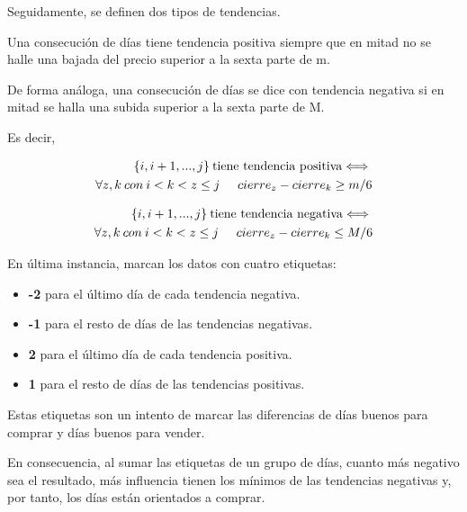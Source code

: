     Seguidamente, se definen dos tipos de tendencias.
    
    Una consecuci\'on de d\'ias tiene tendencia positiva siempre que en mitad no se halle una bajada del precio superior a la sexta parte de m.
    
    De forma an\'aloga, una consecuci\'on de d\'ias se dice con tendencia negativa si en mitad se halla una subida superior a la sexta parte de M.
    
    Es decir,
    
    \begin{align*}
    \begin{split}
        \{i,i+1,...,j\}\: \text{tiene tendencia positiva} \Longleftrightarrow{}\\
        \forall z,k\: con \:i < k < z\leq j\hspace{0.5cm} cierre_{z} - cierre_{k} \geq m/6
    \end{split}
    \end{align*}
    
    \begin{align*}
    \begin{split}
        \{i,i+1,...,j\}\: \text{tiene tendencia negativa} \Longleftrightarrow{}\\
        \forall z,k\: con \:i < k < z\leq j\hspace{0.5cm} cierre_{z} - cierre_{k} \leq M/6
    \end{split}
    \end{align*}

    En \'ultima instancia, marcan los datos con cuatro etiquetas:
    \begin{itemize}
        \item \textbf{-2} para el \'ultimo d\'ia de cada tendencia negativa.
        \item \textbf{-1} para el resto de d\'ias de las tendencias negativas.
        \item \textbf{2} para el \'ultimo d\'ia de cada tendencia positiva.
        \item \textbf{1} para el resto de d\'ias de las tendencias positivas.
    \end{itemize}
    
    Estas etiquetas son un intento de marcar las diferencias de d\'ias buenos para comprar y d\'ias buenos para vender. 
    
    En consecuencia, al sumar las etiquetas de un grupo de d\'ias, cuanto m\'as negativo sea el resultado, m\'as influencia tienen los m\'inimos de las tendencias negativas y, por tanto, los d\'ias est\'an orientados a comprar.
    
